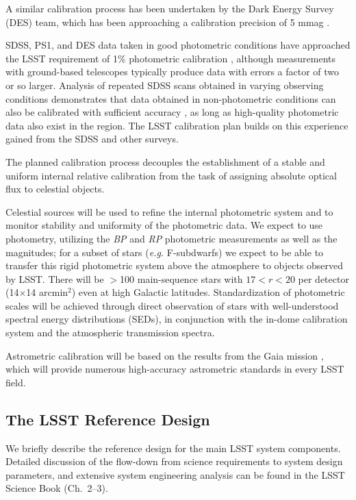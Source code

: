 A similar calibration process has been undertaken by the Dark Energy
Survey (DES) team, which has been approaching a calibration
precision of 5 mmag \citep{2018AJ....155...41B}.

SDSS, PS1, and DES data
taken in good photometric conditions have approached the LSST
requirement of 1\% photometric calibration
\citep{2008ApJ...674.1217P,2012ApJ...756..158S,2018AJ....155...41B}, although measurements with ground-based telescopes
typically produce data with errors a factor of two or so larger. Analysis of
repeated SDSS scans obtained in varying observing conditions demonstrates that data
obtained in
non-photometric conditions can also be calibrated with
sufficient accuracy \citep{2007AJ....134..973I}, as long as high-quality
photometric data also exist in the region.
The LSST calibration plan builds on this experience gained from the SDSS and other surveys.

The planned calibration process decouples the establishment of a stable and uniform internal
relative calibration from the task of assigning absolute optical flux to
celestial objects.

Celestial sources will be used to refine the internal photometric system and
to monitor stability and uniformity of the photometric data. We expect to use \citet{2016A&A...595A...2G} photometry, utilizing
the \textit{BP} and \textit{RP} photometric measurements as well as the  magnitudes; for a subset
of stars (\textit{e.g.} F-subdwarfs) we expect to be able to transfer this rigid photometric system above
the atmosphere to objects observed by LSST.
There will be
$>$100 main-sequence stars with $17<r<20$ per detector (14$\times$14 arcmin$^2$)
even at high Galactic latitudes. Standardization of photometric scales will be
achieved through direct observation of stars with well-understood spectral
energy distributions (SEDs), in conjunction with the in-dome calibration system and the atmospheric transmission spectra.

Astrometric calibration will be based on the results from the Gaia mission \citep{2016A&A...595A...2G}, which will provide
numerous high-accuracy astrometric standards in every LSST field.

\subsection{The LSST  Reference Design}

We briefly describe the reference design for the main LSST system components.
Detailed discussion of the flow-down from science requirements to system
design parameters, and extensive system engineering analysis can be
found in the LSST Science Book (Ch.~2--3).

